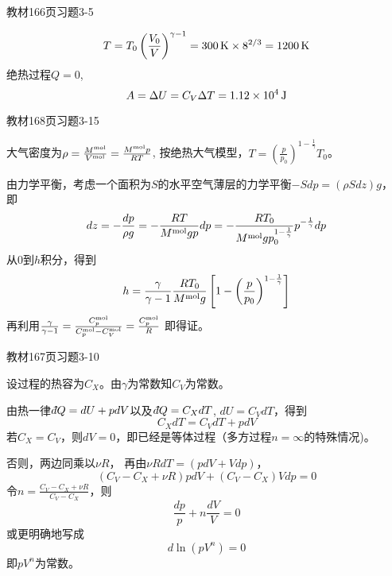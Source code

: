 \documentclass[CJK]{beamer}
\begin{document}
\begin{frame}
  \bch
  教材166页习题3-5
  \ech
\end{frame}

\begin{frame}
  \bch
  $$T=T_0\left(\frac{V_0}{V}\right)^{\gamma-1} = 300\,\mathrm{K}\times 8^{2/3} = 1200\,\mathrm{K} $$
  绝热过程$Q=0$,
  $$A = \Delta U =C_V\Delta T  = 1.12\times 10^4\,\mathrm{J}$$
  \ech
\end{frame}

\begin{frame}
  \bch
  教材168页习题3-15
  \ech
\end{frame}

\begin{frame}
  \bch
  {\small
    大气密度为$ \rho = \frac{M^{\rm mol}}{V^{\rm mol}} = \frac{M^{\rm mol}p}{RT} $,   按绝热大气模型，$T = \left(\frac{p}{p_0}\right)^{1-\frac{1}{\gamma}} T_0$。
    
  由力学平衡，考虑一个面积为$S$的水平空气薄层的力学平衡$-S dp = (\rho S dz)g $， 即
  $$ dz =-\frac{dp}{\rho g} = -\frac{RT }{M^{\rm mol}gp}dp= -\frac{RT_0}{M^{\rm mol}gp_0^{1-\frac{1}{\gamma}}} p^{-\frac{1}{\gamma}} dp$$
  从$0$到$h$积分，得到
  $$ h = \frac{\gamma}{\gamma-1}\frac{RT_0}{M^{\rm mol}g}\left[1-\left(\frac{p}{p_0}\right)^{1-\frac{1}{\gamma}}\right]$$
  再利用$\frac{\gamma}{\gamma-1} = \frac{C_p^{\rm mol}}{C_p^{\rm mol}-C_V^{\rm mol}} = \frac{C_p^{\rm mol}}{R}$
    即得证。
  }
  \ech
\end{frame}

\begin{frame}
  \bch
  教材167页习题3-10
  \ech
\end{frame}


\begin{frame}
  \bch
  {\small
  设过程的热容为$C_X$。由$\gamma$为常数知$C_V$为常数。

  由热一律$\dbar Q = dU + pdV$以及$\dbar Q = C_X dT$, $dU = C_V dT$，得到
  $$ C_X dT = C_V dT + p dV$$
  若$C_X = C_V$，则$dV = 0$，即已经是等体过程（多方过程$n=\infty$的特殊情况)。
    
    否则，两边同乘以$\nu R$， 再由$\nu R dT =  (pdV + Vdp) $，
  $$ (C_V-C_X + \nu R) pdV + (C_V-C_X) Vdp = 0$$
  令$n =\frac{C_V-C_X + \nu R}{C_V-C_X }$，则
  $$ \frac{dp}{p} + n\frac{dV}{V} = 0$$
  或更明确地写成
  $$ d \ln (pV^n) = 0$$
  即$pV^n$为常数。
  }
  \ech
\end{frame}
\end{document}
